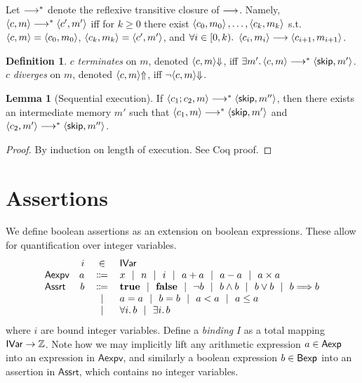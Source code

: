 \documentclass[10pt]{article}
\theoremstyle{definition}
\newtheorem{definition}{Definition}
\newtheorem{lemma}{Lemma}
\begin{document}
Let $\mathrel{\mathrel{\longrightarrow}^{\ast}}$ denote the reflexive transitive closure of $\mathrel{\longrightarrow}$. Namely,
$\Cfg(c,m) \sstepstotrans \Cfg(c',m')$ iff
for $k\geq 0$ there exist
$\Cfg(c_0,m_0),\dots,\Cfg(c_k,m_k)$
s.t.\ $\Cfg(c,m)=\Cfg(c_0,m_0)$,
$\Cfg(c_k,m_k)=\Cfg(c',m')$,
and $\forall i \in [0,k).\ \Cfg(c_i,m_i) \sstepsto \Cfg(c_{i+1},m_{i+1})$.

\begin{definition}
    $c$ \emph{terminates} on $m$, denoted $\Terminate(c,m)$,
    iff $\exists m'. \Cfg(c,m) \sstepstotrans \Cfg(\Skip,m')$.
    $c$ \emph{diverges} on $m$, denoted $\Diverge(c,m)$,
    iff $\neg \Terminate(c,m)$.
\end{definition}

\begin{lemma}[Sequential execution]
    If $\Cfg(c_1; c_2, m) \sstepstotrans \Cfg(\Skip, m'')$, 
    then there exists an intermediate memory $m'$ such that
    $\Cfg(c_1, m) \sstepstotrans \Cfg(\Skip, m')$
    and $\Cfg(c_2, m') \sstepstotrans \Cfg(\Skip, m'')$.
\end{lemma}
\begin{proof}
    By induction on length of execution. See Coq proof.
\end{proof}

\section{Assertions}

\newcommand*{\domivar}{\mathsf{IVar}}

\newcommand*{\DomAssert}{\mathsf{Assrt}}
\newcommand*{\DomAexpv}{\mathsf{Aexpv}}

We define boolean assertions as an extension
on boolean expressions.
These allow for quantification over
integer variables.
\begin{displaymath}
\begin{array}{lrcl}
    & i & \in  & \domivar \\
    \DomAexpv & a & \bnf & x \ALT n \ALT i \ALT a + a \ALT a - a \ALT a \times a \\
    \DomAssert & b & \bnf & \True \ALT \False \ALT 
        \neg b \ALT b \wedge b \ALT b \vee b \ALT b \Longrightarrow b \\\
    && \ALT & a = a \ALT b = b \ALT a < a \ALT a \leq a \\
    && \ALT & \forall i.\, b \ALT \exists i.\, b
\end{array}
\end{displaymath}
where $i$ are bound integer variables.
Define a \emph{binding} $I$ as a total mapping $\domivar \rightarrow \Z$.
%
Note how we may implicitly lift any
arithmetic expression $a \in \mathsf{Aexp}$ into
an expression in $\DomAexpv$,
and similarly a
boolean expression $b \in \mathsf{Bexp}$ into
an assertion in $\DomAssert$, which
contains no integer variables.
\end{document}
